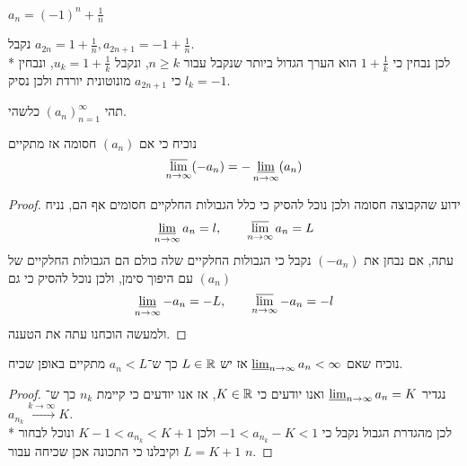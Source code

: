 \Subquestion{}
$a_n = {(-1)}^n + \frac{1}{n}$

נקבל $a_{2n} = 1 + \frac{1}{n}, a_{2n + 1} = -1 + \frac{1}{n}$. \\*
לכן נבחין כי $1 + \frac{1}{k}$ הוא הערך הגדול ביותר שנקבל עבור $n \ge k$, ונקבל $u_k = 1 + \frac{1}{k}$, ונבחין כי $a_{2n + 1}$ מונוטונית יורדת ולכן נסיק $l_k = -1$.

\Question{}
תהי ${(a_n)}_{n = 1}^\infty$ כלשהי.

\Subquestion{}
נוכיח כי אם $(a_n)$ חסומה אז מתקיים
\[
	\operatorname*{\overline{lim}}_{n \to \infty} (-a_n) = - \operatorname*{\underline{lim}}_{n \to \infty}(a_n)
\]
\begin{proof}
	ידוע שהקבוצה חסומה ולכן נוכל להסיק כי כלל הגבולות החלקיים חסומים אף הם, נניח
	\[
		\operatorname*{\underline{lim}}_{n \to \infty} a_n = l,
		\qquad
		\operatorname*{\overline{lim}}_{n \to \infty} a_n = L
	\]
	עתה, אם נבחן את $(-a_n)$ נקבל כי הגבולות החלקיים שלה כולם הם הגבולות החלקיים של $(a_n)$ עם היפוך סימן, ולכן נוכל להסיק כי גם
	\[
		\operatorname*{\underline{lim}}_{n \to \infty} -a_n = -L,
		\qquad
		\operatorname*{\overline{lim}}_{n \to \infty} -a_n = -l
	\]
	ולמעשה הוכחנו עתה את הטענה.
\end{proof}

\Subquestion{}
נוכיח שאם $\operatorname*{\underline{lim}}_{n \to \infty} a_n < \infty$ אז יש $L \in \mathbb{R}$ כך ש־$a_n < L$ מתקיים באופן שכיח.
\begin{proof}
	נגדיר $\operatorname*{\underline{lim}}_{n \to \infty} a_n = K$ ואנו יודעים כי $K \in \mathbb{R}$, אז אנו יודעים כי קיימת $n_k$ כך ש־$a_{n_k} \xrightarrow{k \to \infty} K$. \\*
	לכן מהגדרת הגבול נקבל כי $-1 < a_{n_k} - K < 1$ ולכן $K - 1 < a_{n_k} < K + 1$ ונוכל לבחור $L = K + 1$ וקיבלנו כי התכונה אכן שכיחה עבור $n$.
\end{proof}

